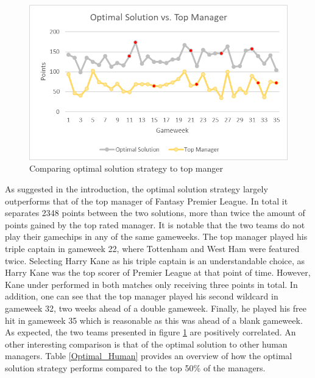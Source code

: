 \begin{figure}[H]
\label{fig:Top_Manager}
    \centering
    \includegraphics[scale=0.75]{fig/chapter_7/Top_manager.png}
    \caption{Comparing optimal solution strategy to top manger}
\label{Top_Manager}    
\end{figure}

As suggested in the introduction, the optimal solution strategy largely outperforms that of the top manager of Fantasy Premier League. In total it separates 2348 points between the two solutions, more than twice the amount of points gained by the top rated manager. It is notable that the two teams do not play their gamechips in any of the same gameweeks. The top manager played his triple captain in gameweek 22, where Tottenham and West Ham were featured twice. Selecting Harry Kane as his triple captain is an understandable choice, as Harry Kane was the top scorer of Premier League at that point of time. However, Kane under performed in both matches only receiving three points in total. In addition, one can see that the top manager played his second wildcard in gameweek 32, two weeks ahead of a double gameweek. Finally, he played his free hit in gameweek 35 which is reasonable as this was ahead of a blank gameweek. As expected, the two teams presented in figure \ref{Top_Manager} are positively correlated.   
\newpar
An other interesting comparison is that of the optimal solution to other human managers. Table \ref{Optimal_Human} provides an overview of how the optimal solution strategy performs compared to the top 50\% of the managers. 

